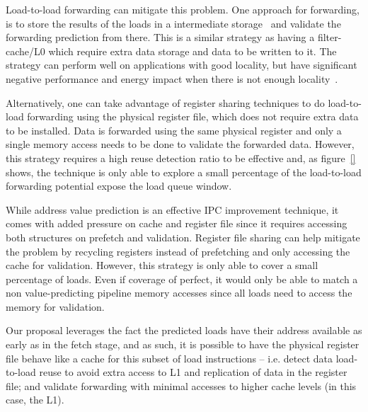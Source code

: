 \documentclass{sig-alternate}
\begin{document}
Load-to-load forwarding can mitigate this problem. One approach for forwarding, is to store the results of the loads in a intermediate storage~\cite{} and validate the forwarding prediction from there. This is a similar strategy as having a filter-cache/L0 which require extra data storage and data to be written to it. The strategy can perform well on applications with good locality, but have significant negative performance and energy impact when there is not enough locality~\cite{}.  

Alternatively, one can take advantage of register sharing techniques to do load-to-load forwarding using the physical register file, which does not require extra data to be installed. Data is forwarded using the same physical register and only a single memory access needs to be done to validate the forwarded data. However, this strategy requires a high reuse detection ratio to be effective and, as figure~\ref{} shows, the technique is only able to explore a small percentage of the load-to-load forwarding potential expose the load queue window.

While address value prediction is an effective IPC improvement technique, it comes with added pressure on cache and register file since it requires accessing both structures on prefetch and validation. Register file sharing can help mitigate the problem by recycling registers instead of prefetching and only accessing the cache for validation. However, this strategy is only able to cover a small percentage of loads. Even if coverage of perfect, it would only be able to match a non value-predicting pipeline memory accesses since all loads need to access the memory for validation.  

Our proposal leverages the fact the predicted loads have their address available as early as in the fetch stage, and as such, it is possible to have the physical register file behave like a cache for this subset of load instructions -- i.e. detect data load-to-load reuse to avoid extra access to L1 and replication of data in the register file; and validate forwarding with minimal accesses to higher cache levels (in this case, the L1).
\end{document}
